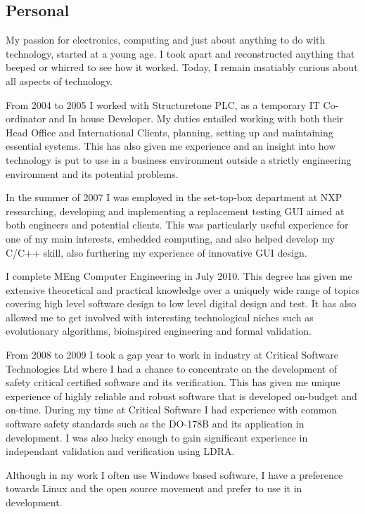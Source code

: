 \documentclass[overlapped,line,letterpaper]{res}
\begin{document}
\begin{resume}
\newpage

\section{\bf{ Personal } }
My passion for electronics, computing and just about anything to do with
technology, started at a young age.
I took apart and reconstructed anything that beeped or whirred to see how it
worked.
Today, I remain insatiably curious about all aspects of technology.

From 2004 to 2005 I worked with Structuretone PLC, as a temporary IT
Co-ordinator and In house Developer.
My duties entailed working with both their Head Office and International Clients,
planning, setting up and maintaining essential systems.
This has also given me experience and an insight into how technology is put to
use in a business environment outside a strictly engineering environment and its
potential problems.

In the summer of 2007 I was employed in the set-top-box department at NXP
researching, developing and implementing a replacement testing GUI aimed at both
engineers and potential clients.
This was particularly useful experience for one of my main interests, embedded
computing, and also helped develop my C/C++ skill, also furthering my experience
of innovative GUI design.

I complete MEng Computer Engineering in July 2010.
This degree has given me extensive theoretical and practical knowledge over a
uniquely wide range of topics covering high level software design to low level
digital design and test.
It has also allowed me to get involved with interesting technological niches
such as evolutionary algorithms, bioinspired engineering and formal validation.

From 2008 to 2009 I took a gap year to work in industry at Critical Software
Technologies Ltd where I had a chance to concentrate on the development of
safety critical certified software and its verification.
This has given me unique experience of highly reliable and robust software that
is developed on-budget and on-time.
During my time at Critical Software I had experience with common software
safety standards such as the DO-178B and its application in development.
I was also lucky enough to gain significant experience in independant validation
and verification using LDRA.

Although in my work I often use Windows based software, I have a preference towards
Linux and the open source movement and prefer to use it in development.


\end{resume}
\end{document}
